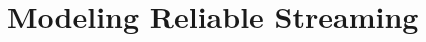 \documentclass{beamer}
\begin{document}
\begin{frame}
\end{frame}









\section{Modeling Reliable Streaming}
\end{document}
